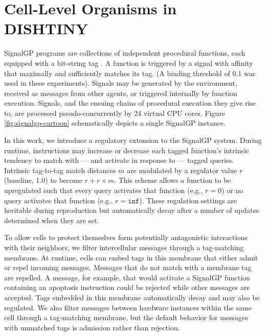 \section{Cell-Level Organisms in DISHTINY} \label{sec:cell_level_organisms}

SignalGP programs are collections of independent procedural functions, each equipped with a bit-string tag .
A function is triggered by a signal with affinity that maximally and sufficiently matches its tag.
(A binding threshold of 0.1 was used in these experiments).
Signals may be generated by the environment, received as messages from other agents, or triggered internally by function execution.
Signals, and the ensuing chains of procedural execution they give rise to, are processed pseudo-concurrently by 24 virtual CPU cores.
Figure \ref{fig:signalgp-cartoon} schematically depicts a single SignalGP instance.

In this work, we introduce a regulatory extension to the SignalGP system.
During runtime, instructions may increase or decrease each tagged function's intrinsic tendency to match with --- and activate in response to --- tagged queries.
Intrinsic tag-to-tag match distances $m$ are modulated by a regulator value $r$ (baseline, 1.0) to become $r + r \times m$.
This scheme allows a function to be upregulated such that every query activates that function (e.g., $r = 0$) or no query activates that function (e.g., $r = \texttt{inf}$).
These regulation settings are heritable during reproduction but automatically decay after a number of updates determined when they are set.

To allow cells to protect themselves form potentially antagonistic interactions with their neighbors, we filter intercellular messages through a tag-matching membrane.
At runtime, cells can embed tags in this membrane that either admit or repel incoming messages.
Messages that do not match with a membrane tag are repelled.
A message, for example, that would activate a SignalGP function containing an apoptosis instruction could be rejected while other messages are accepted.
Tags embedded in this membrane automatically decay and may also be regulated.
We also filter messages between hardware instances within the same cell through a tag-matching membrane, but the default behavior for messages with unmatched tags is admission rather than rejection.

